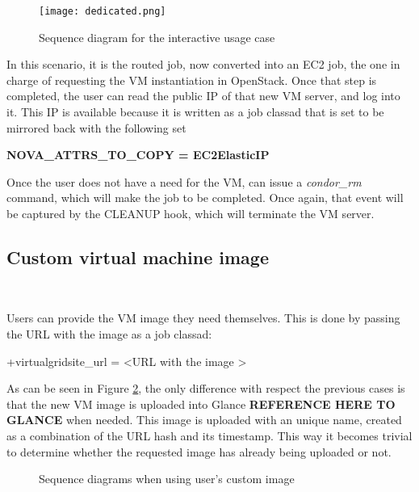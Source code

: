 \documentclass[a4paper]{jpconf}
\begin{document}
\begin{figure}[h]
    \centering
    \texttt{[image: dedicated.png]}
    \caption{Sequence diagram for the interactive usage case}
    \label{fig:interactive}
\end{figure}

In this scenario, it is the routed job, now converted into an EC2 job, 
the one in charge of requesting the VM instantiation in OpenStack.
Once that step is completed, the user can read the public IP of that new VM server, and log into it. 
This IP is available because it is written as a job classad that is set to be mirrored back with the following set

\begin{center}
    \colorbox{htcondorbox}{
        \begin{minipage}{\textwidth}
        \small
            \bf{NOVA\_ATTRS\_TO\_COPY = EC2ElasticIP
            }
        \end{minipage}
    }
\end{center}

Once the user does not have a need for the VM, can issue a \textit{condor\_rm} command, 
which will make the job to be completed. 
Once again, that event will be captured by the CLEANUP hook, which will terminate the VM server. 



\subsection{Custom virtual machine image}

~

Users can provide the VM image they need themselves. 
This is done by passing the URL with the image as a job classad:
\begin{center}
    +virtualgridsite\_url = \textless URL with the image \textgreater
\end{center}

As can be seen in Figure \ref{fig:custom}, 
the only difference with respect the previous cases is that the new VM image is uploaded into Glance \textbf{REFERENCE HERE TO GLANCE} when needed.
This image is uploaded with an unique name, 
created as a combination of the URL hash and its timestamp. 
This way it becomes trivial to determine whether the requested image has already being uploaded or not. 

\begin{figure}[h]
    \centering
    \qquad
    \caption{Sequence diagrams when using user's custom image}%
    \label{fig:custom}%
\end{figure}
\end{document}
